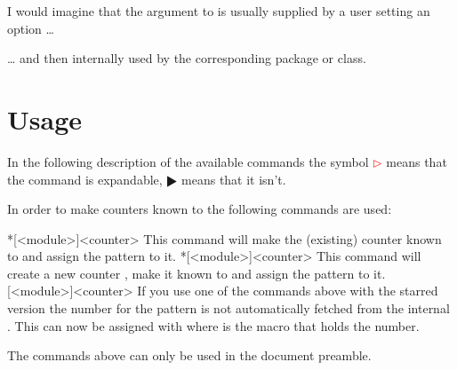 \documentclass[toc=index,toc=bib,numbers=noendperiod]{cnpkgdoc}
\newcommand*\unexpsign{$\RHD$}
\newcommand*\expsign{\textcolor{red}{$\rhd$}}
\begin{document}
\begin{beispiel}
\end{beispiel}

I would imagine that the argument to  is usually
supplied by a user setting an option \ldots
\begin{beispiel}
\end{beispiel}
\ldots{} and then internally used by the corresponding package or class.

\section{Usage}
In the following description of the available commands the symbol \expsign{}
means that the command is expandable, \unexpsign{} means that it isn't.

In order to make counters known to \cntformats the following commands are used:
\begin{beschreibung}
 *[<module>]{<counter>}\newline
   This command will make the (existing) counter  known to
   \cntformats and assign the pattern  to it.
 *[<module>]{<counter>}\newline
   This command will create a new counter , make it known to
   \cntformats and assign the pattern  to it.
 [<module>]{<counter>}\newline
   If you use one of the commands above with the starred version the number for
   the pattern is not automatically fetched from the internal .
   This can now be assigned with  where 
   is the macro that holds the number.
\end{beschreibung}
The commands above can only be used in the document preamble.
\end{document}
